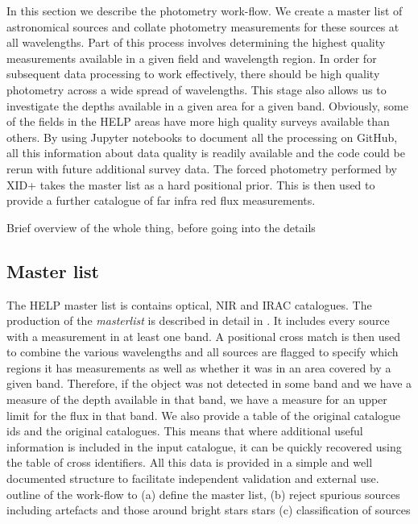 \documentclass[usenatbib]{mnras}
\begin{document}
In this section we describe the photometry work-flow.  We create a master list 
of astronomical sources and collate photometry measurements for these sources 
at all wavelengths. Part of this process involves determining the highest 
quality measurements available in a given field and wavelength region. In order 
for subsequent data processing to work effectively, there should be high quality 
photometry across a wide spread of wavelengths. This stage also allows us to 
investigate the depths available in a given area for a given band. Obviously,
some of the fields in the HELP areas have more high quality surveys available than others.
By using Jupyter notebooks to document all the processing on GitHub, all this 
information about data quality is readily available and the code could be rerun with future 
additional survey data. The forced photometry performed by XID+ takes the master list as a hard positional prior. This is then used to provide a further catalogue of far infra red flux measurements.


Brief overview of the whole thing, before going into the details 

\subsection[Master List\\ {\color{red}Basically a very brief summary of Raph's paper, but really just pointing to it}]{Master list}
\label{sec:masterlist}
The HELP master list is contains optical, NIR and IRAC catalogues.  The production of the 
\emph{masterlist} is described in detail in \citep{Shirley:2019}. It includes every 
source with a measurement in at least one band. A positional cross match is then
used to combine the various wavelengths and all sources are flagged to specify
which regions it has measurements as well as whether it was in an area covered by a
given band. Therefore, if the object was not detected in some band and we have a measure 
of the depth available in that band, we have a measure for an upper limit for the flux in
that band. We also provide a table of the original catalogue ids and the original catalogues.
This means that where additional useful information is included in the input catalogue,
it can be quickly recovered using the table of cross identifiers. All this data is provided in a
simple and well documented structure to facilitate independent validation and external use.
{\color{red} outline of the work-flow to (a) define the master list, (b) reject
spurious sources including artefacts and those around bright stars stars (c)
classification of sources }
\end{document}
